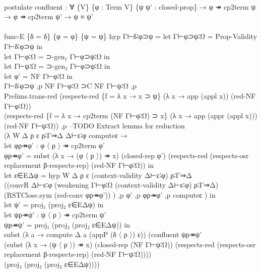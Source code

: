 {\begin{code}
{\>\<\\
\>postulate confluent : ∀ \{V\} \{φ : Term V\} \{ψ ψ' : closed-prop\} → φ ↠ cp2term ψ → φ ↠ cp2term ψ' → ψ ≡ ψ'\<\\
\>\<\\
\>func-E \{δ = δ\} \{φ = φ\} \{ψ = ψ\} hyp Γ⊢δ∶φ⊃ψ = let Γ⊢φ⊃ψ∶Ω = Prop-Validity Γ⊢δ∶φ⊃ψ in\<\\
\>                      let Γ⊢φ∶Ω = ⊃-gen₁ Γ⊢φ⊃ψ∶Ω in\<\\
\>                      let Γ⊢ψ∶Ω = ⊃-gen₂ Γ⊢φ⊃ψ∶Ω in\<\\
\>                      let φ' = NF Γ⊢φ∶Ω in\<\\
\>                      Γ⊢δ∶φ⊃ψ ,p NF Γ⊢φ∶Ω ⊃C NF Γ⊢ψ∶Ω ,p \<\\
\>                      Prelims.trans-red (respects-red \{f = λ x → x ⊃ ψ\} (λ x → app (appl x)) (red-NF Γ⊢φ∶Ω)) \<\\
\>                                (respects-red \{f = λ x → cp2term (NF Γ⊢φ∶Ω) ⊃ x\} (λ x → app (appr (appl x))) (red-NF Γ⊢ψ∶Ω)) ,p  --TODO Extract lemma for reduction\<\\
\>                      (λ W Δ ρ ε ρ∶Γ⇒Δ Δ⊢ε∶φ computeε →\<\\
\>                      let φρ↠φ' : φ 〈 ρ 〉 ↠ cp2term φ'\<\\
\>                          φρ↠φ' = subst (λ x → (φ 〈 ρ 〉) ↠ x) (closed-rep φ') (respects-red (respects-osr replacement β-respects-rep) (red-NF Γ⊢φ∶Ω)) in\<\\
\>                      let ε∈EΔψ = hyp W Δ ρ ε (context-validity Δ⊢ε∶φ) ρ∶Γ⇒Δ        \<\\
\>                                  ((convR Δ⊢ε∶φ (weakening Γ⊢φ∶Ω (context-validity Δ⊢ε∶φ) ρ∶Γ⇒Δ) (RSTClose.sym (red-conv φρ↠φ')) ) ,p φ' ,p φρ↠φ' ,p computeε ) in \<\\
\>                      let ψ' = proj₁ (proj₂ ε∈EΔψ) in \<\\
\>                      let ψρ↠ψ' : ψ 〈 ρ 〉 ↠ cp2term ψ'\<\\
\>                          ψρ↠ψ' = proj₁ (proj₂ (proj₂ ε∈EΔψ)) in \<\\
\>                      subst (λ a → compute Δ a (appP (δ 〈 ρ 〉) ε)) (confluent ψρ↠ψ' \<\\
\>                        (subst (λ x → (ψ 〈 ρ 〉) ↠ x) (closed-rep (NF Γ⊢ψ∶Ω)) (respects-red (respects-osr replacement β-respects-rep) (red-NF Γ⊢ψ∶Ω)))) \<\\
\>                        (proj₂ (proj₂ (proj₂ ε∈EΔψ))))\<\\
}
\end{code}}
